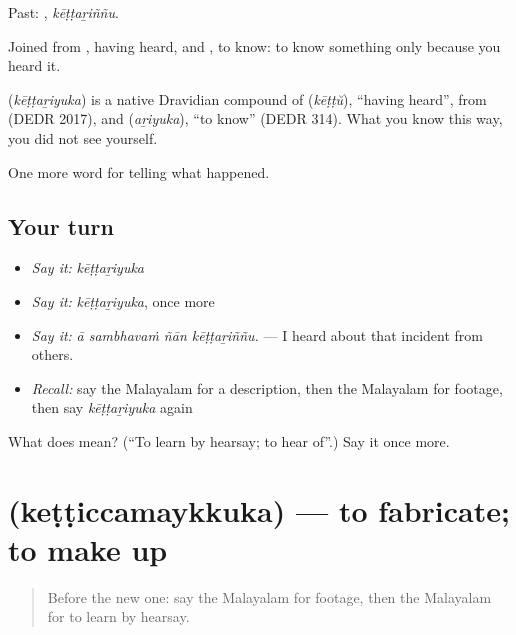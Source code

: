 Past: , \emph{kēṭṭaṟiññu}.

Joined from , having heard, and , to know: to know something only because you heard it.

\begin{cousinweb}
\textbf{} (\emph{kēṭṭaṟiyuka}) is a native Dravidian compound of  (\emph{kēṭṭŭ}), \textquotedblleft{}having heard\textquotedblright{}, from  (DEDR 2017), and  (\emph{aṟiyuka}), \textquotedblleft{}to know\textquotedblright{} (DEDR 314). What you know this way, you did not see yourself.
\end{cousinweb}

\begin{grammarlens}[title={What you've built}]
One more word for telling what happened.
\end{grammarlens}

\subsection*{Your turn}
\begin{itemize}
\raggedright
  \item \emph{Say it:} \emph{kēṭṭaṟiyuka}
  \item \emph{Say it:} \emph{kēṭṭaṟiyuka}, once more
  \item \emph{Say it:} \emph{ā sambhavaṁ ñān kēṭṭaṟiññu.} — I heard about that incident from others.
  \item \emph{Recall:} say the Malayalam for a description, then the Malayalam for footage, then say \emph{kēṭṭaṟiyuka} again
\end{itemize}

\begin{tcolorbox}[breakable,colback=teal!4,colframe=teal!35!black,title={Before you move on}]
What does  mean? (\textquotedblleft{}To learn by hearsay; to hear of\textquotedblright{}.) Say it once more.
\end{tcolorbox}
\section[\texorpdfstring{\ml{കെട്ടിച്ചമയ്ക്കുക} (keṭṭiccamaykkuka)}{കെട്ടിച്ചമയ്ക്കുക (keṭṭiccamaykkuka)}]{ (keṭṭiccamaykkuka) — to fabricate; to make up}

\label{lesson:ML-C356-ketticcamaykkuka}



\begin{quote}
Before the new one: say the Malayalam for footage, then the Malayalam for to learn by hearsay.
\end{quote}

